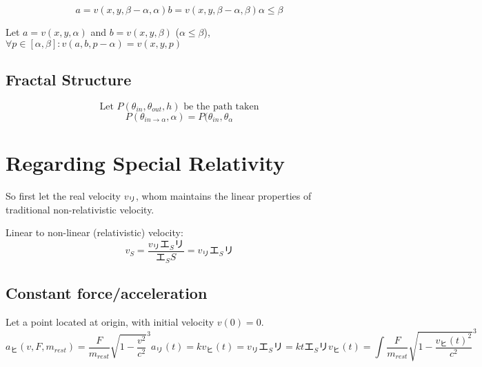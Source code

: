 \documentclass[preprint]{ptephy_v1}%
\newcommand{\jp}[1]{#1}
\newcommand{\jp}[1]{\text{#1}}
\begin{document}
\begin{subequations}
\begin{equation}
a=v(x, y, \beta-\alpha, \alpha)
\end{equation}
\begin{equation}
b=v(x, y, \beta-\alpha, \beta)
\end{equation}
\begin{equation}
\alpha\leq\beta
\end{equation}
\end{subequations}

Let $a=v(x, y, \alpha)$ and $b=v(x, y, \beta)$ ($\alpha\leq\beta$), $\forall p\in[\alpha, \beta]: v(a, b, p-\alpha)=v(x, y, p)$

\subsection{Fractal Structure}
\begin{equation}
    \text{Let }P(\theta_{in}, \theta_{out}, h)\text{ be the path taken}
\end{equation}
\begin{equation}
    P(\theta_{in\to\alpha}, \alpha)=P(\theta_{in}, \theta_{\alpha}
\end{equation}


\newpage
\section{Regarding Special Relativity}
So first let the real velocity \(v_リ\), whom maintains the linear properties of traditional non-relativistic velocity.


Linear to non-linear (relativistic) velocity:
\begin{equation}
    v_S=\frac{v_\jp{リ}\jp{エ}_S\jp{リ}}{\jp{エ}_SS}=v_\jp{リ}\jp{エ}_S\jp{リ}
\end{equation}

\subsection{Constant force/acceleration}
Let a point located at origin, with initial velocity $v(0)=0$.
\begin{subequations}
    \begin{equation}
        a_\jp{ヒ}(v, F, m_{rest})=\frac{F}{m_{rest}}\sqrt{1-\frac{v^2}{c^2}}^3
    \end{equation}
    \begin{equation}
        a_\jp{リ}(t)=k
    \end{equation}
    \begin{equation}
        v_\jp{ヒ}(t)=v_\jp{リ}\jp{エ}_S\jp{リ}=kt\jp{エ}_S\jp{リ}
    \end{equation}
    \begin{equation}
        v_\jp{ヒ}(t)=\int \frac{F}{m_{rest}}\sqrt{1-\frac{v_\jp{ヒ}(t)^2}{c^2}}^3
    \end{equation}
\end{subequations}
\end{document}
